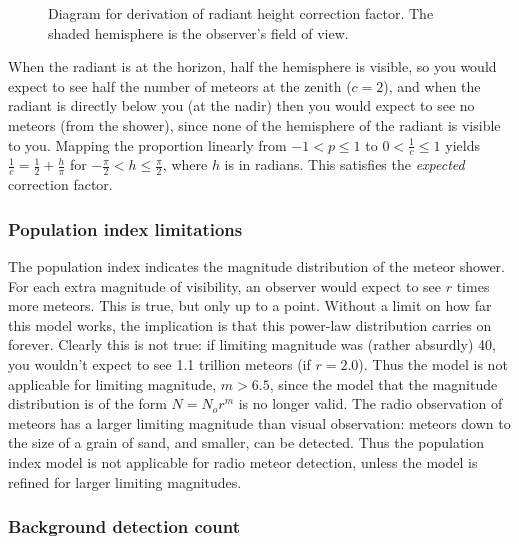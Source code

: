\begin{figure}[h!] 
	\centering 
	 
	\caption{Diagram for derivation of radiant height correction factor. The
	shaded hemisphere is the observer's field of view.}
	\label{fig:hemisphere}
\end{figure}

When the radiant is at the horizon, half the hemisphere is visible, so you
would expect to see half the number of meteors at the zenith ($c = 2$), and
when the radiant is directly below you (at the nadir) then you would expect to
see no meteors (from the shower), since none of the hemisphere of the radiant
is visible to you. Mapping the proportion linearly from $-1 < p \leq 1$ to $0 <
\frac{1}{c} \leq 1$ yields $\frac{1}{c} = \frac{1}{2} + \frac{h}{\pi}$ for
$-\frac{\pi}{2} < h \leq \frac{\pi}{2}$, where $h$ is in radians. This
satisfies the \textit{expected} correction factor.

\subsubsection{Population index limitations}

The population index indicates the magnitude distribution of the meteor shower.
For each extra magnitude of visibility, an observer would expect to see $r$
times more meteors. This is true, but only up to a point. Without a limit on
how far this model works, the implication is that this power-law distribution
carries on forever. Clearly this is not true: if limiting magnitude was (rather
absurdly) 40, you wouldn't expect to see 1.1 trillion meteors (if $r=2.0$).
Thus the model is not applicable for limiting magnitude, $m > 6.5$, since the
model that the magnitude distribution is of the form $N = N_or^m$ is no longer
valid. The radio observation of meteors has a larger limiting magnitude than
visual observation: meteors down to the size of a grain of sand, and smaller,
can be detected. Thus the population index model is not applicable for radio
meteor detection, unless the model is refined for larger limiting magnitudes.

\subsubsection{Background detection count}

